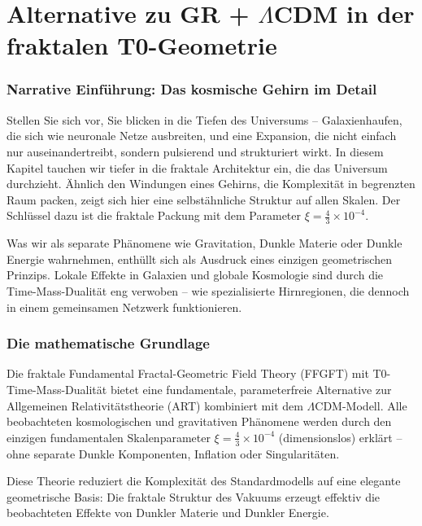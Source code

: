 \chapter{Alternative zu GR + $\Lambda$CDM in der fraktalen T0-Geometrie}


	
	\subsection*{Narrative Einführung: Das kosmische Gehirn im Detail}
	
	Stellen Sie sich vor, Sie blicken in die Tiefen des Universums – Galaxienhaufen, die sich wie neuronale Netze ausbreiten, und eine Expansion, die nicht einfach nur auseinandertreibt, sondern pulsierend und strukturiert wirkt. In diesem Kapitel tauchen wir tiefer in die fraktale Architektur ein, die das Universum durchzieht. Ähnlich den Windungen eines Gehirns, die Komplexität in begrenzten Raum packen, zeigt sich hier eine selbstähnliche Struktur auf allen Skalen. Der Schlüssel dazu ist die fraktale Packung mit dem Parameter \(\xi = \frac{4}{3} \times 10^{-4}\).
	
	Was wir als separate Phänomene wie Gravitation, Dunkle Materie oder Dunkle Energie wahrnehmen, enthüllt sich als Ausdruck eines einzigen geometrischen Prinzips. Lokale Effekte in Galaxien und globale Kosmologie sind durch die Time-Mass-Dualität eng verwoben – wie spezialisierte Hirnregionen, die dennoch in einem gemeinsamen Netzwerk funktionieren.
	
	\subsection*{Die mathematische Grundlage}
	
	Die fraktale Fundamental Fractal-Geometric Field Theory (FFGFT) mit T0-Time-Mass-Dualität bietet eine fundamentale, parameterfreie Alternative zur Allgemeinen Relativitätstheorie (ART) kombiniert mit dem \(\Lambda\)CDM-Modell. Alle beobachteten kosmologischen und gravitativen Phänomene werden durch den einzigen fundamentalen Skalenparameter \(\xi = \frac{4}{3} \times 10^{-4}\) (dimensionslos) erklärt – ohne separate Dunkle Komponenten, Inflation oder Singularitäten.
	
	Diese Theorie reduziert die Komplexität des Standardmodells auf eine elegante geometrische Basis: Die fraktale Struktur des Vakuums erzeugt effektiv die beobachteten Effekte von Dunkler Materie und Dunkler Energie.
	
